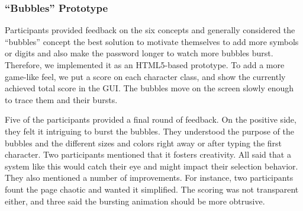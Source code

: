 \subsubsection{``Bubbles'' Prototype}
Participants provided feedback on the six concepts and generally considered the ``bubbles'' concept the best solution to motivate themselves to add more symbols or digits and also make the password longer to watch more bubbles burst. Therefore, we implemented it as an HTML5-based prototype. To add a more game-like feel, we put a score on each character class, and show the currently achieved total score in the GUI. The bubbles move on the screen slowly enough to trace them and their bursts. 

Five of the participants provided a final round of feedback. On the positive side, they felt it intriguing to burst the bubbles. They understood the purpose of the bubbles and the different sizes and colors right away or after typing the first character. Two participants mentioned that it fosters creativity. All said that a system like this would catch their eye and might impact their selection behavior. They also mentioned a number of improvements. For instance, two participants fount the page chaotic and wanted it simplified. The scoring was not transparent either, and three said the bursting animation should be more obtrusive. 

